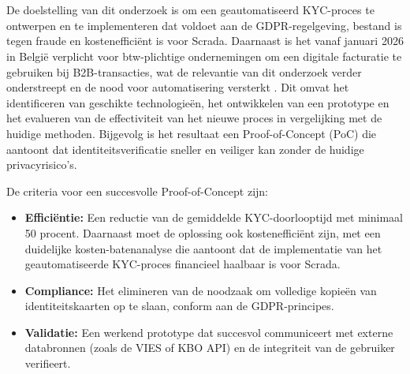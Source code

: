 \section{}%
\label{sec:onderzoeksdoelstelling}

De doelstelling van dit onderzoek is om een geautomatiseerd KYC-proces te ontwerpen en te implementeren dat voldoet aan de GDPR-regelgeving, bestand is tegen fraude en kostenefficiënt is voor Scrada. 
Daarnaast is het vanaf januari 2026 in België verplicht voor btw-plichtige ondernemingen om een digitale facturatie te gebruiken bij B2B-transacties, wat de relevantie van dit onderzoek verder onderstreept en de nood voor automatisering versterkt \autocite{Vlaio2025}.
Dit omvat het identificeren van geschikte technologieën, het ontwikkelen van een prototype en het evalueren van de effectiviteit van het nieuwe proces in vergelijking met de huidige methoden.
Bijgevolg is het resultaat een Proof-of-Concept (PoC) die aantoont dat identiteitsverificatie sneller en veiliger kan zonder de huidige privacyrisico's.

De criteria voor een succesvolle Proof-of-Concept zijn:
\begin{itemize}
    \item \textbf{Efficiëntie:} Een reductie van de gemiddelde KYC-doorlooptijd met minimaal 50 procent. Daarnaast moet de oplossing ook kostenefficiënt zijn, met een duidelijke kosten-batenanalyse die aantoont dat de implementatie van het geautomatiseerde KYC-proces financieel haalbaar is voor Scrada.
    \item \textbf{Compliance:} Het elimineren van de noodzaak om volledige kopieën van identiteitskaarten op te slaan, conform aan de GDPR-principes.
    \item \textbf{Validatie:} Een werkend prototype dat succesvol communiceert met externe databronnen (zoals de VIES of KBO API) en de integriteit van de gebruiker verifieert.
\end{itemize}


\section{}%
\label{sec:opzet-bachelorproef}



